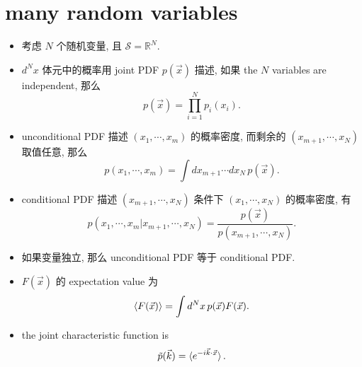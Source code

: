 \section{many random variables}
\begin{itemize}
	\item 考虑 $N$ 个随机变量, 且 $\mathcal{S} = \mathbb{R}^N$.
	
	\item $d^N x$ 体元中的概率用 joint PDF $p(\vec{x})$ 描述, 如果 the $N$ variables are independent, 那么
	\begin{equation}
		p(\vec{x}) = \prod_{i = 1}^N p_i(x_i).
	\end{equation}
	
	\item unconditional PDF 描述 $(x_1, \cdots, x_m)$ 的概率密度, 而剩余的 $(x_{m + 1}, \cdots, x_N)$ 取值任意, 那么
	\begin{equation}
		p(x_1, \cdots, x_m) = \int dx_{m + 1} \cdots dx_N \, p(\vec{x}).
	\end{equation}
	
	\item conditional PDF 描述 $(x_{m + 1}, \cdots, x_N)$ 条件下 $(x_1, \cdots, x_N)$ 的概率密度, 有
	\begin{equation}
		p(x_1, \cdots, x_m | x_{m + 1}, \cdots, x_N) = \frac{p(\vec{x})}{p(x_{m + 1}, \cdots, x_N)}.
	\end{equation}
	
	\item 如果变量独立, 那么 unconditional PDF 等于 conditional PDF.
	
	\item $F(\vec{x})$ 的 expectation value 为
	\begin{equation}
		\braket{F(\vec{x})} = \int d^N x \, p(\vec{x}) F(\vec{x}).
	\end{equation}
	
	\item the joint characteristic function is
	\begin{equation}
		\tilde{p}(\vec{k}) = \braket{e^{- i \vec{k} \cdot \vec{x}}}.
	\end{equation}
	

\end{itemize}
